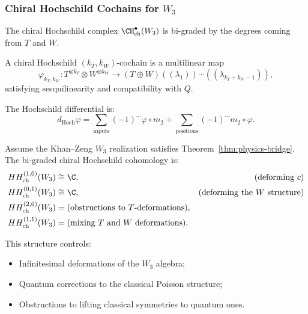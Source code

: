 \subsubsection{Chiral Hochschild Cochains for $W_3$}

The chiral Hochschild complex $\CH^\bullet_{\text{ch}}(W_3)$ is bi-graded by the degrees coming from $T$ and $W$.

\begin{definition}
A chiral Hochschild $(k_T, k_W)$-cochain is a multilinear map
\begin{equation}
\varphi_{k_T, k_W}: T^{\otimes k_T} \otimes W^{\otimes k_W} \to (T \oplus W)((\lambda_1))\cdots((\lambda_{k_T+k_W-1})),
\end{equation}
satisfying sesquilinearity and compatibility with $Q$.
\end{definition}

The Hochschild differential is:
\begin{equation}
d_{\text{Hoch}} \varphi = \sum_{\text{inputs}} (-1)^{\cdots} \varphi \circ m_2 + \sum_{\text{positions}} (-1)^{\cdots} m_2 \circ \varphi.
\end{equation}

\begin{proposition}
Assume the Khan--Zeng $W_3$ realization satisfies
Theorem~\ref{thm:physics-bridge}.
The bi-graded chiral Hochschild cohomology is:
\begin{align}
HH^{(1,0)}_{\text{ch}}(W_3) &\cong \C, & \text{(deforming $c$)}\\
HH^{(0,1)}_{\text{ch}}(W_3) &\cong \C, & \text{(deforming the $W$ structure)}\\
HH^{(2,0)}_{\text{ch}}(W_3) &= \text{(obstructions to } T \text{-deformations)},\\
HH^{(1,1)}_{\text{ch}}(W_3) &= \text{(mixing } T \text{ and } W \text{ deformations)}.
\end{align}
\end{proposition}

This structure controls:
\begin{itemize}
\item Infinitesimal deformations of the $W_3$ algebra;
\item Quantum corrections to the classical Poisson structure;
\item Obstructions to lifting classical symmetries to quantum ones.
\end{itemize}

